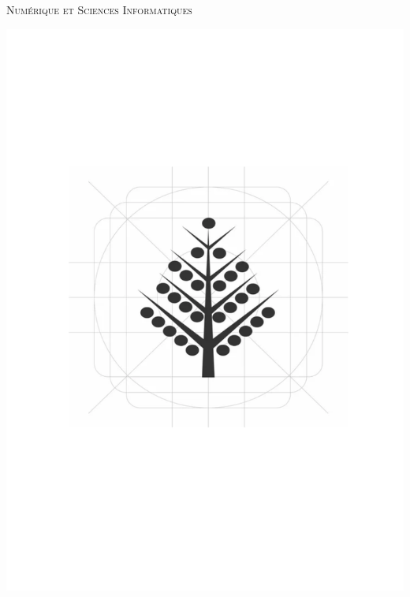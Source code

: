 \begin{titlepage}
\newcommand{\HRule}{\rule{\linewidth}{0.5mm}}
\center
\textsc{\LARGE
Numérique et Sciences Informatiques
} \\[1cm]
\begin{minipage}{0.4\linewidth}
    \centering
    \includegraphics[scale=0.3, trim=20 200 20 200]{arbreb.png}
\end{minipage}\begin{minipage}{0.4\linewidth}
    \centering

\end{minipage}
\end{titlepage}
